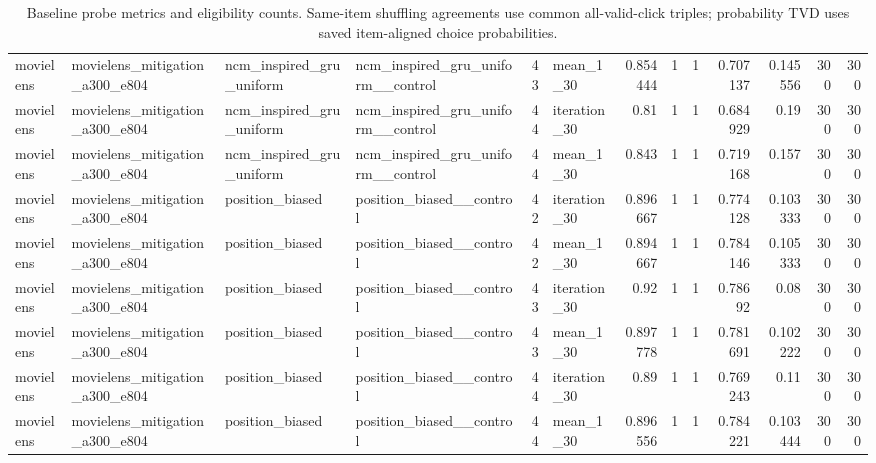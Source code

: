 \begin{table}[htbp!]
\begin{tabular}{llllrlrrrrrrr}
movielens & movielens\_mitigation\_a300\_e804 & ncm\_inspired\_gru\_uniform & ncm\_inspired\_gru\_uniform\_\_control & 43 & mean\_1\_30 & 0.854444 & 1 & 1 & 0.707137 & 0.145556 & 300 & 300 \\
movielens & movielens\_mitigation\_a300\_e804 & ncm\_inspired\_gru\_uniform & ncm\_inspired\_gru\_uniform\_\_control & 44 & iteration\_30 & 0.81 & 1 & 1 & 0.684929 & 0.19 & 300 & 300 \\
movielens & movielens\_mitigation\_a300\_e804 & ncm\_inspired\_gru\_uniform & ncm\_inspired\_gru\_uniform\_\_control & 44 & mean\_1\_30 & 0.843 & 1 & 1 & 0.719168 & 0.157 & 300 & 300 \\
movielens & movielens\_mitigation\_a300\_e804 & position\_biased & position\_biased\_\_control & 42 & iteration\_30 & 0.896667 & 1 & 1 & 0.774128 & 0.103333 & 300 & 300 \\
movielens & movielens\_mitigation\_a300\_e804 & position\_biased & position\_biased\_\_control & 42 & mean\_1\_30 & 0.894667 & 1 & 1 & 0.784146 & 0.105333 & 300 & 300 \\
movielens & movielens\_mitigation\_a300\_e804 & position\_biased & position\_biased\_\_control & 43 & iteration\_30 & 0.92 & 1 & 1 & 0.78692 & 0.08 & 300 & 300 \\
movielens & movielens\_mitigation\_a300\_e804 & position\_biased & position\_biased\_\_control & 43 & mean\_1\_30 & 0.897778 & 1 & 1 & 0.781691 & 0.102222 & 300 & 300 \\
movielens & movielens\_mitigation\_a300\_e804 & position\_biased & position\_biased\_\_control & 44 & iteration\_30 & 0.89 & 1 & 1 & 0.769243 & 0.11 & 300 & 300 \\
movielens & movielens\_mitigation\_a300\_e804 & position\_biased & position\_biased\_\_control & 44 & mean\_1\_30 & 0.896556 & 1 & 1 & 0.784221 & 0.103444 & 300 & 300 \\
\hline
\end{tabular}
\caption{Baseline probe metrics and eligibility counts. Same-item shuffling agreements use common all-valid-click triples; probability TVD uses saved item-aligned choice probabilities.}
\label{chap:results:tab:rq5_predictor_eligibility}
\end{table}
